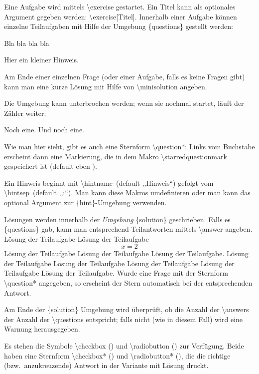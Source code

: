 \documentclass[hyperworksheet]{drcschool}
\makeatletter
\newcommand*{\cs}[1]{\textup{\ttfamily\textbackslash#1}}                   %
\newcommand*{\opt}[1]{\textup{\ttfamily#1}}                                %
\newcommand*{\env}[1]{\textup{\ttfamily\{#1\}}}                            %
\newcommand*{\TikZ}{\textup{Ti\textit{k}Z}}                                %
\newcommand*{\withtikz}{%
   \textcolor{teal}{%
      \vtop{%
         \vbox{%
            \vss                                                           %
            \hrule height\p@                                               %
            \kern2\p@                                                      %
            \hbox{\normalfont\normalsize( \TikZ\ )}%
         }%
         \kern\p@                                                          %
         \hrule height\p@                                                  %
      }%
   }%
}                                                                          %
\makeatother
\begin{document}
\begin{worksheet}
\exercise[Titel]\label{ex:foo}
Eine Aufgabe wird mittels \cs{exercise} gestartet.
Ein Titel kann als optionales Argument gegeben werden: \cs{exercise[Titel]}.
Innerhalb einer Aufgabe können einzelne Teilaufgaben mit Hilfe der Umgebung
\env{questions} gestellt werden:
\begin{questions}
\question Bla bla bla bla
\begin{hint}
Hier ein kleiner Hinweis.
\end{hint}
\question Am Ende einer einzelnen Frage (oder einer Aufgabe, falls es keine Fragen gibt)
   kann man eine kurze Lösung mit Hilfe von \cs{minisolution} angeben.
\end{questions}
Die Umgebung kann unterbrochen werden; wenn sie nochmal startet, läuft der Zähler
weiter:
\begin{questions}
\question* Noch eine.
\question Und noch eine.
\end{questions}
Wie man hier sieht, gibt es auch eine Sternform \cs{question*}:
Links vom Buchstabe erscheint dann eine Markierung, die in dem Makro
\cs{starredquestionmark} gespeichert ist (default eben \opt{*}).
\begin{hint}[Aufpassen!]
Ein Hinweis beginnt mit \cs{hintname}~(default ,,Hinweis``) gefolgt vom \cs{hintsep}~(default ,,:``).
Man kann diese Makros umdefinieren oder man kann das optional Argument zur \env{hint}-Umgebung
verwenden.
\end{hint}

\begin{solution}
Lösungen werden innerhalb der \emph{Umgebung} \env{solution} geschrieben.
Falls es \env{questions} gab, kann man entsprechend Teilantworten mittels \cs{answer}
angeben.
\answer Lösung der Teilaufgabe Lösung der Teilaufgabe
\[
x=2
\]
Lösung der Teilaufgabe Lösung der Teilaufgabe Lösung der Teilaufgabe.
\answer Lösung der Teilaufgabe Lösung der Teilaufgabe Lösung der Teilaufgabe Lösung der Teilaufgabe Lösung der Teilaufgabe.
\answer Wurde eine Frage mit der Sternform \cs{question*} angegeben, so erscheint der
Stern automatisch bei der entsprechenden Antwort.

Am Ende der \env{solution} Umgebung wird überprüft, ob die Anzahl der \cs{answer}s
der Anzahl der \cs{question}s entspricht; falls nicht (wie in diesem Fall) wird eine Warnung herausgegeben.
\end{solution}

\exercisesymbol{\withtikz}
Es stehen die Symbole \cs{checkbox} (\checkbox) und \cs{radiobutton} (\radiobutton)
zur Verfügung. Beide haben eine Sternform \cs{checkbox*} (\checkbox*) und
\cs{radiobutton*} (\radiobutton*), die die richtige (bzw.~anzukreuzende) Antwort
in der Variante mit Lösung druckt.


\end{worksheet}
\end{document}
